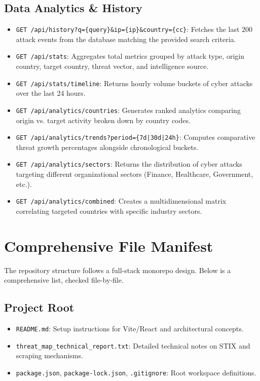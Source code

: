 \documentclass[12pt,a4paper]{article}
\begin{document}
\subsection{Data Analytics \& History}
\begin{itemize}
    \item \verb|GET /api/history?q={query}&ip={ip}&country={cc}|: Fetches the last 200 attack events from the database matching the provided search criteria.
    \item \verb|GET /api/stats|: Aggregates total metrics grouped by attack type, origin country, target country, threat vector, and intelligence source.
    \item \verb|GET /api/stats/timeline|: Returns hourly volume buckets of cyber attacks over the last 24 hours.
    \item \verb|GET /api/analytics/countries|: Generates ranked analytics comparing origin vs. target activity broken down by country codes.
    \item \verb+GET /api/analytics/trends?period={7d|30d|24h}+: Computes comparative threat growth percentages alongside chronological buckets.
    \item \verb|GET /api/analytics/sectors|: Returns the distribution of cyber attacks targeting different organizational sectors (Finance, Healthcare, Government, etc.).
    \item \verb|GET /api/analytics/combined|: Creates a multidimensional matrix correlating targeted countries with specific industry sectors.
\end{itemize}

\newpage
\section{Comprehensive File Manifest}

The repository structure follows a full-stack monorepo design. Below is a comprehensive list, checked file-by-file.

\subsection{Project Root}
\begin{itemize}[noitemsep]
    \item \verb|README.md|: Setup instructions for Vite/React and architectural concepts.
    \item \verb|threat_map_technical_report.txt|: Detailed technical notes on STIX and scraping mechanisms.
    \item \verb|package.json|, \verb|package-lock.json|, \verb|.gitignore|: Root workspace definitions.
\end{itemize}
\end{document}
